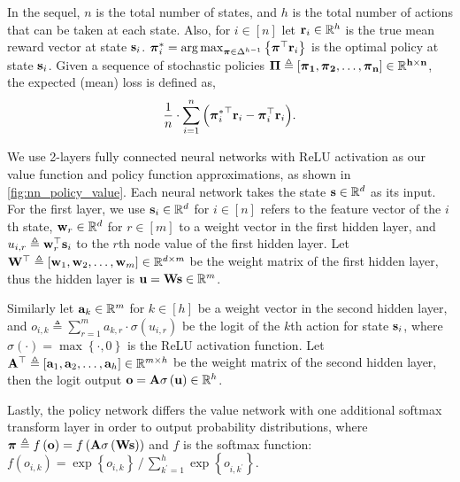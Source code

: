 In the sequel, $n$ is the total number of states, and $h$ is the total number of actions that can be taken at each state.
Also, for $i\in[n]$ let ${\mathbf{r}}_i \in {\mathbb{R}}^h$ is the true mean reward vector at state ${\mathbf{s}}_i$. ${\boldsymbol{\pi}}_i^* = \operatorname*{arg\,max}_{{\boldsymbol{\pi}} \in \Delta^{h-1}}{\left\{ {\boldsymbol{\pi}}^\top {\mathbf{r}}_i \right\}}$ is the optimal policy at state ${\mathbf{s}}_i$. Given a sequence of  stochastic policies $\bf{\Pi} \triangleq \left[ {\boldsymbol{\pi}}_1, {\boldsymbol{\pi}}_2, \dots, {\boldsymbol{\pi}}_n \right] \in {\mathbb{R}}^{h \times n}$, the expected (mean) loss is defined as,
\begin{equation}
\label{eq:expected_loss}
\begin{split}
\frac{1}{n} \cdot \sum\limits_{i=1}^{n}{ \left( {{\boldsymbol{\pi}}_i^*}^\top {\mathbf{r}}_i - {\boldsymbol{\pi}}_i^\top {\mathbf{r}}_i \right) }.
\end{split}
\end{equation}

We use 2-layers fully connected neural networks with ReLU activation as our value function and policy function approximations, as shown in \cref{fig:nn_policy_value}. 
Each neural network takes the state ${\mathbf{s}} \in {\mathbb{R}}^d$ as its input. 
For the first layer, we use ${\mathbf{s}}_i \in {\mathbb{R}}^d$ for $i \in [n]$ refers to the feature vector of the $i$th state, ${\mathbf{w}}_r \in {\mathbb{R}}^d$ for $r \in [m]$ to a weight vector in the first hidden layer, and $u_{i,r} \triangleq {\mathbf{w}}_r^\top {\mathbf{s}}_i$ to the $r$th node value of the first hidden layer.
Let ${\mathbf{W}}^\top \triangleq \left[ {\mathbf{w}}_1, {\mathbf{w}}_2, \dots, {\mathbf{w}}_m \right] \in {\mathbb{R}}^{d \times m}$ be the weight matrix of the first hidden layer, thus the hidden layer is ${\mathbf{u}} = {\mathbf{W}}{\mathbf{s}}\in{\mathbb{R}}^m$.

Similarly let ${\mathbf{a}}_k \in {\mathbb{R}}^m$ for $k \in [h]$ be a weight vector in the second hidden layer, and $o_{i,k} \triangleq \sum_{r=1}^{m}{a_{k,r} \cdot \sigma\left( u_{i,r} \right)}$ be the logit of the $k$th action for state ${\mathbf{s}}_i$, where $\sigma(\cdot) = \max\left\{ \cdot, 0 \right\}$ is the ReLU activation function. 
Let ${\mathbf{A}}^\top \triangleq \left[ {\mathbf{a}}_1, {\mathbf{a}}_2, \dots, {\mathbf{a}}_h \right] \in {\mathbb{R}}^{m \times h}$ be the weight matrix of the second hidden layer, then the logit output ${\mathbf{o}} = {\mathbf{A}}\sigma\left( {\mathbf{u}}\right) \in {\mathbb{R}}^h$.

Lastly, the policy network differs the value network with one additional softmax transform layer in order to output probability distributions, where ${\boldsymbol{\pi}} \triangleq f\left( {\mathbf{o}} \right) = f\left( {\mathbf{A}} \sigma\left( {\mathbf{W}} {\mathbf{s}} \right) \right)$ and $f$ is the softmax function: $f\left( o_{i,k} \right) = \exp\left\{ o_{i,k} \right\} \,/\, \sum_{k^\prime = 1}^{h}{\exp\left\{ o_{i,k^\prime} \right\}}$.